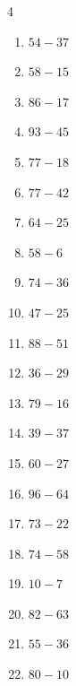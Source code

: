 \begin{multicols}{4}
\begin{enumerate}
  \item $54-37$
        \phantom{$=17$}

  \item $58-15$
        \phantom{$=43$}

  \item $86-17$
        \phantom{$=69$}

  \item $93-45$
        \phantom{$=48$}

  \item $77-18$
        \phantom{$=59$}

  \item $77-42$
        \phantom{$=35$}

  \item $64-25$
        \phantom{$=39$}

  \item $58-6$
        \phantom{$=52$}

  \item $74-36$
        \phantom{$=38$}

  \item $47-25$
        \phantom{$=22$}

  \item $88-51$
        \phantom{$=37$}

  \item $36-29$
        \phantom{$=7$}

  \item $79-16$
        \phantom{$=63$}

  \item $39-37$
        \phantom{$=2$}

  \item $60-27$
        \phantom{$=33$}

  \item $96-64$
        \phantom{$=32$}

  \item $73-22$
        \phantom{$=51$}

  \item $74-58$
        \phantom{$=16$}

  \item $10-7$
        \phantom{$=3$}

\columnbreak %

  \item $82-63$
        \phantom{$=19$}

  \item $55-36$
        \phantom{$=19$}

  \item $80-10$
        \phantom{$=70$}


\end{enumerate}
\end{multicols}

